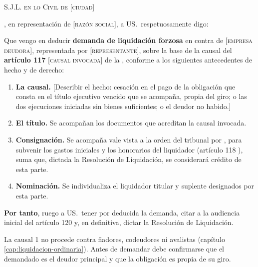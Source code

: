 \begin{escrito}
\small
\noindent\textsc{S.J.L. en lo Civil de} [\textsc{ciudad}]

\medskip
{}, en representación de [\textsc{razón social}], a
US.\ respetuosamente digo:

\medskip
Que vengo en deducir \textbf{demanda de liquidación forzosa} en contra de
[\textsc{empresa deudora}], representada por [\textsc{representante}], sobre la base de la
causal del \textbf{artículo 117 \Nro} [\textsc{causal invocada}] de la \LIR{}, conforme a
los siguientes antecedentes de hecho y de derecho:

\begin{enumerate}[leftmargin=1.6em]
  \item \textbf{La causal.} [Describir el hecho: cesación en el pago de la obligación que
  consta en el título ejecutivo vencido que se acompaña, propia del giro; o las dos
  ejecuciones iniciadas sin bienes suficientes; o el deudor no habido.]

  \item \textbf{El título.} Se acompañan los documentos que acreditan la causal invocada.

  \item \textbf{Consignación.} Se acompaña vale vista a la orden del tribunal por
  , para subvenir los gastos iniciales y los honorarios del liquidador (artículo
  118 ), suma que, dictada la Resolución de Liquidación, se considerará crédito de
  esta parte.

  \item \textbf{Nominación.} Se individualiza el liquidador titular y suplente designados
  por esta parte.
\end{enumerate}

\medskip
\noindent\textbf{Por tanto}, ruego a US.\ tener por deducida la demanda, citar a la
audiencia inicial del artículo 120 y, en definitiva, dictar la Resolución de Liquidación.
\end{escrito}

\begin{alerta}
La causal 1 no procede contra fiadores, codeudores ni avalistas (capítulo
\ref{cap:liquidacion-ordinaria}). Antes de demandar debe confirmarse que el demandado es el
deudor principal y que la obligación es propia de su giro.
\end{alerta}

